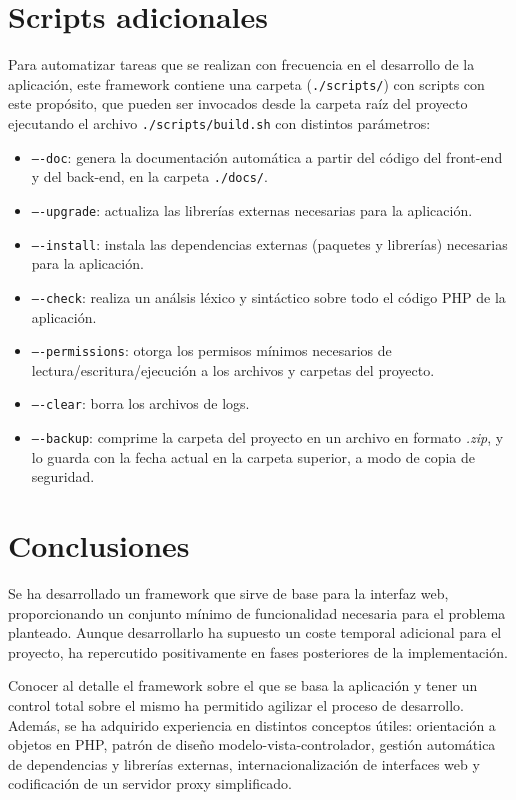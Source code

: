 \section{Scripts adicionales\label{extra:mvc:scripts}}

Para automatizar tareas que se realizan con frecuencia en el desarrollo de la aplicación, este \gls{framework} contiene una carpeta (\texttt{./scripts/}) con \glspl{script} con este propósito, que pueden ser invocados desde la carpeta raíz del proyecto ejecutando el archivo \texttt{./scripts/build.sh} con distintos parámetros:
\begin{itemize}
  \item \texttt{----doc}: genera la documentación automática a partir del código del \gls{front-end} y del \gls{back-end}, en la carpeta \texttt{./docs/}.
  \item \texttt{----upgrade}: actualiza las librerías externas necesarias para la aplicación.
  \item \texttt{----install}: instala las dependencias externas (paquetes y librerías) necesarias para la aplicación.
  \item \texttt{----check}: realiza un análsis léxico y sintáctico sobre todo el código \gls{PHP} de la aplicación.
  \item \texttt{----permissions}: otorga los permisos mínimos necesarios de lectura/escritura/ejecución a los archivos y carpetas del proyecto.
  \item \texttt{----clear}: borra los archivos de \glspl{log}.
  \item \texttt{----backup}: comprime la carpeta del proyecto en un archivo en formato \textit{.zip}, y lo guarda con la fecha actual en la carpeta superior, a modo de copia de seguridad.
\end{itemize}

\section{Conclusiones\label{extra:mvc:conclusiones}}

Se ha desarrollado un \gls{framework} que sirve de base para la interfaz web, proporcionando un conjunto mínimo de funcionalidad necesaria para el problema planteado.
Aunque desarrollarlo ha supuesto un coste temporal adicional para el proyecto, ha repercutido positivamente en fases posteriores de la implementación.

Conocer al detalle el \gls{framework} sobre el que se basa la aplicación y tener un control total sobre el mismo ha permitido agilizar el proceso de desarrollo.
Además, se ha adquirido experiencia en distintos conceptos útiles: orientación a objetos en \gls{PHP}, patrón de diseño modelo-vista-controlador, gestión automática de dependencias y librerías externas, internacionalización de interfaces web y codificación de un servidor \gls{proxy} simplificado.
